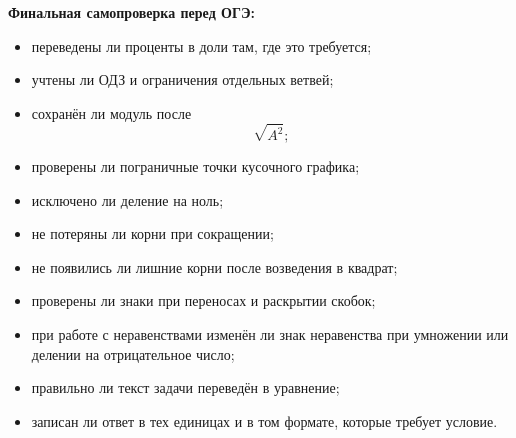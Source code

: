 \documentclass[a4paper,12pt]{article}
\begin{document}
\vspace{8mm}

\textbf{Финальная самопроверка перед ОГЭ:}

\begin{itemize}

  \item переведены ли проценты в доли там, где это требуется;

  \item учтены ли ОДЗ и ограничения отдельных ветвей;

  \item сохранён ли модуль после
  \[
  \sqrt{A^2};
  \]

  \item проверены ли пограничные точки кусочного графика;

  \item исключено ли деление на ноль;

  \item не потеряны ли корни при сокращении;

  \item не появились ли лишние корни после возведения в квадрат;

  \item проверены ли знаки при переносах и раскрытии скобок;

  \item при работе с неравенствами изменён ли знак неравенства
  при умножении или делении на отрицательное число;

  \item правильно ли текст задачи переведён в уравнение;

  \item записан ли ответ в тех единицах и в том формате,
  которые требует условие.

\end{itemize}
\end{document}
